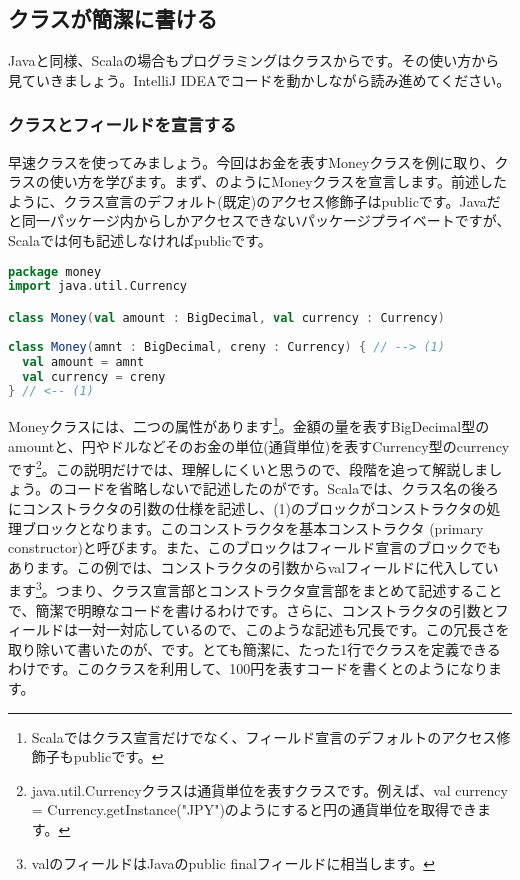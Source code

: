 \subsection{クラスが簡潔に書ける}
Javaと同様、Scalaの場合もプログラミングはクラスからです。その使い方から見ていきましょう。IntelliJ IDEAでコードを動かしながら読み進めてください。
\subsubsection{クラスとフィールドを宣言する}
早速クラスを使ってみましょう。今回はお金を表すMoneyクラスを例に取り、クラスの使い方を学びます。まず、のようにMoneyクラスを宣言します。前述したように、クラス宣言のデフォルト(既定)のアクセス修飾子はpublicです。Javaだと同一パッケージ内からしかアクセスできないパッケージプライベートですが、Scalaでは何も記述しなければpublicです。

\begin{lstlisting}[language=scala, label=src:money, caption=Moneyクラス]
package money
import java.util.Currency

class Money(val amount : BigDecimal, val currency : Currency)
\end{lstlisting}

\begin{lstlisting}[language=scala, label=src:verbose_money, caption=Moneyクラス(省略しないで書いたもの)]
class Money(amnt : BigDecimal, creny : Currency) { // --> (1)
  val amount = amnt
  val currency = creny
} // <-- (1)
\end{lstlisting}

Moneyクラスには、二つの属性があります\footnote{Scalaではクラス宣言だけでなく、フィールド宣言のデフォルトのアクセス修飾子もpublicです。}。金額の量を表すBigDecimal型のamountと、円やドルなどそのお金の単位(通貨単位)を表すCurrency型のcurrencyです\footnote{java.util.Currencyクラスは通貨単位を表すクラスです。例えば、val currency = Currency.getInstance("JPY")のようにすると円の通貨単位を取得できます。}。この説明だけでは、理解しにくいと思うので、段階を追って解説しましょう。のコードを省略しないで記述したのがです。Scalaでは、クラス名の後ろにコンストラクタの引数の仕様を記述し、(1)のブロックがコンストラクタの処理ブロックとなります。このコンストラクタを基本コンストラクタ (primary constructor)と呼びます。また、このブロックはフィールド宣言のブロックでもあります。この例では、コンストラクタの引数からvalフィールドに代入しています\footnote{valのフィールドはJavaのpublic finalフィールドに相当します。}。つまり、クラス宣言部とコンストラクタ宣言部をまとめて記述することで、簡潔で明瞭なコードを書けるわけです。さらに、コンストラクタの引数とフィールドは一対一対応しているので、このような記述も冗長です。この冗長さを取り除いて書いたのが、です。とても簡潔に、たった1行でクラスを定義できるわけです。このクラスを利用して、100円を表すコードを書くとのようになります。

